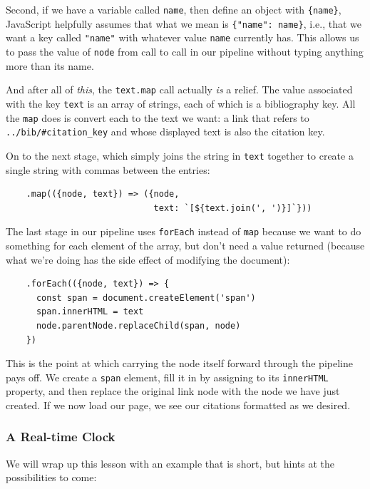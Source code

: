 Second, if we have a variable called \texttt{name}, then define an
object with \texttt{\{name\}}, JavaScript helpfully assumes that what we
mean is \texttt{\{"name":\ name\}}, i.e., that we want a key called
\texttt{"name"} with whatever value \texttt{name} currently has. This
allows us to pass the value of \texttt{node} from call to call in our
pipeline without typing anything more than its name.

And after all of \emph{this}, the \texttt{text.map} call actually
\emph{is} a relief. The value associated with the key \texttt{text} is
an array of strings, each of which is a bibliography key. All the
\texttt{map} does is convert each to the text we want: a link that
refers to \texttt{../bib/\#citation\_key} and whose displayed text is
also the citation key.

On to the next stage, which simply joins the string in \texttt{text}
together to create a single string with commas between the entries:

\begin{verbatim}
    .map(({node, text}) => ({node,
                             text: `[${text.join(', ')}]`}))
\end{verbatim}

The last stage in our pipeline uses \texttt{forEach} instead of
\texttt{map} because we want to do something for each element of the
array, but don't need a value returned (because what we're doing has the
side effect of modifying the document):

\begin{verbatim}
    .forEach(({node, text}) => {
      const span = document.createElement('span')
      span.innerHTML = text
      node.parentNode.replaceChild(span, node)
    })
\end{verbatim}

This is the point at which carrying the node itself forward through the
pipeline pays off. We create a \texttt{span} element, fill it in by
assigning to its \texttt{innerHTML} property, and then replace the
original link node with the node we have just created. If we now load
our page, we see our citations formatted as we desired.

\subsubsection{A Real-time Clock}\label{s:pages-clock}

We will wrap up this lesson with an example that is short, but hints at
the possibilities to come:

